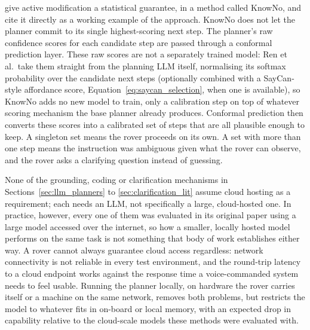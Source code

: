 \citet{ren2023knowno} give active modification a statistical guarantee, in a method called
KnowNo, and \citeauthor{hori2025longhorizon} cite it directly as a working example of the
approach. KnowNo does not let the planner commit to its single highest-scoring next step. The
planner's raw confidence scores for each candidate step are passed through a conformal prediction
layer. These raw scores are not a separately trained model: Ren et al.\ take them straight from
the planning LLM itself, normalising its softmax probability over the candidate next steps
(optionally combined with a SayCan-style affordance score, Equation~\ref{eq:saycan_selection},
when one is available), so KnowNo adds no new model to train, only a calibration step on top of
whatever scoring mechanism the base planner already produces. Conformal prediction then converts
these scores into a calibrated set of steps that are all plausible enough to keep. A singleton set
means the rover proceeds on its own. A set with more than one step means the instruction was
ambiguous given what the rover can observe, and the rover asks a clarifying question instead of
guessing.


%

\label{sec:local_models}

None of the grounding, coding or clarification mechanisms in Sections~\ref{sec:llm_planners} to
\ref{sec:clarification_lit} assume cloud hosting as a requirement; each needs an LLM, not
specifically a large, cloud-hosted one. In practice, however, every one of them was evaluated in
its original paper using a large model accessed over the internet, so how a smaller, locally
hosted model performs on the same task is not something that body of work establishes either way.
A rover cannot always guarantee cloud access regardless: network connectivity is not reliable in
every test environment, and the round-trip latency to a cloud endpoint works against the response
time a voice-commanded system needs to feel usable. Running the planner locally, on hardware the
rover carries itself or a machine on the same network, removes both problems, but restricts the
model to whatever fits in on-board or local memory, with an expected drop in capability relative
to the cloud-scale models these methods were evaluated with.


